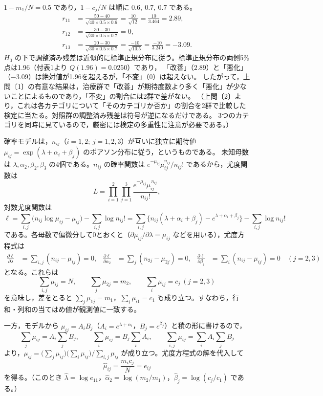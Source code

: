 \documentclass[a4paper,11pt]{ltjsarticle}
\begin{document}
$1-m_1/N=0.5$ であり，$1-c_j/N$ は順に $0.6,\ 0.7,\ 0.7$ である。
\begin{align*}
r_{11}&=\frac{50-40}{\sqrt{40\times0.5\times0.6}}=\frac{10}{\sqrt{12}}=\frac{10}{3.464}=\boxed{2.89},\\
r_{12}&=\frac{30-30}{\sqrt{30\times0.5\times0.7}}=\boxed{0},\\
r_{13}&=\frac{20-30}{\sqrt{30\times0.5\times0.7}}=\frac{-10}{\sqrt{10.5}}=\frac{-10}{3.240}=\boxed{-3.09}.
\end{align*}
$H_0$ の下で調整済み残差は近似的に標準正規分布に従う。標準正規分布の両側5\%点は1.96（付表1より $Q(1.96)=0.0250$）であり，
「改善」（$2.89$）と「悪化」（$-3.09$）は絶対値が1.96を超えるが，「不変」（$0$）は超えない。
したがって，上問〔1〕の有意な結果は，治療群で「改善」が期待度数より多く「悪化」が少ないことによるものであり，「不変」の割合には2群で差がない。
（上問〔2〕より，これは各カテゴリについて「そのカテゴリか否か」の割合を2群で比較した検定に当たる。対照群の調整済み残差は符号が逆になるだけである。
3つのカテゴリを同時に見ているので，厳密には検定の多重性に注意が必要である。）

確率モデルは，$n_{ij}$（$i=1,2;\ j=1,2,3$）が互いに独立に期待値 $\mu_{ij}=\exp(\lambda+\alpha_i+\beta_j)$ のポアソン分布に従う，というものである。
未知母数は $\lambda,\alpha_2,\beta_2,\beta_3$ の4個である。$n_{ij}$ の確率関数は $e^{-\mu_{ij}}\mu_{ij}^{n_{ij}}/n_{ij}!$ であるから，尤度関数は
\[
L=\prod_{i=1}^2\prod_{j=1}^3\frac{e^{-\mu_{ij}}\mu_{ij}^{\,n_{ij}}}{n_{ij}!},
\]
対数尤度関数は
\[
\ell=\sum_{i,j}\bigl(n_{ij}\log\mu_{ij}-\mu_{ij}\bigr)-\sum_{i,j}\log n_{ij}!
=\sum_{i,j}\bigl\{n_{ij}(\lambda+\alpha_i+\beta_j)-e^{\lambda+\alpha_i+\beta_j}\bigr\}-\sum_{i,j}\log n_{ij}!
\]
である。各母数で偏微分して0とおくと（$\partial\mu_{ij}/\partial\lambda=\mu_{ij}$ などを用いる），尤度方程式は
\begin{align*}
\frac{\partial\ell}{\partial\lambda}&=\sum_{i,j}(n_{ij}-\mu_{ij})=0,&
\frac{\partial\ell}{\partial\alpha_2}&=\sum_{j}(n_{2j}-\mu_{2j})=0,&
\frac{\partial\ell}{\partial\beta_j}&=\sum_{i}(n_{ij}-\mu_{ij})=0\quad(j=2,3)
\end{align*}
となる。これらは
\[
\sum_{i,j}\mu_{ij}=N,\qquad \sum_j\mu_{2j}=m_2,\qquad \sum_i\mu_{ij}=c_j\ (j=2,3)
\]
を意味し，差をとると $\sum_j\mu_{1j}=m_1$，$\sum_i\mu_{i1}=c_1$ も成り立つ。すなわち，行和・列和の当てはめ値が観測値に一致する。

一方，モデルから $\mu_{ij}=A_iB_j$（$A_i=e^{\lambda+\alpha_i}$，$B_j=e^{\beta_j}$）と積の形に書けるので，
\[
\sum_j\mu_{ij}=A_i\sum_jB_j,\qquad \sum_i\mu_{ij}=B_j\sum_iA_i,\qquad \sum_{i,j}\mu_{ij}=\sum_iA_i\sum_jB_j
\]
より，$\mu_{ij}=\bigl(\sum_j\mu_{ij}\bigr)\bigl(\sum_i\mu_{ij}\bigr)\big/\sum_{i,j}\mu_{ij}$ が成り立つ。尤度方程式の解を代入して
\[
\hat\mu_{ij}=\frac{m_ic_j}{N}=e_{ij}
\]
を得る。（このとき $\hat\lambda=\log e_{11}$，$\hat\alpha_2=\log(m_2/m_1)$，$\hat\beta_j=\log(c_j/c_1)$ である。）
\end{document}
